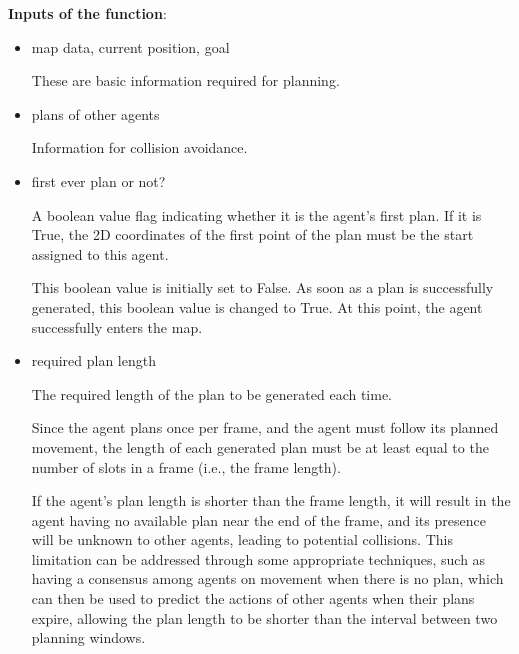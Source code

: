 \textbf{Inputs of the function}:
\begin{itemize}
    \item map data, current position, goal
    
    These are basic information required for planning. 

    \item plans of other agents
    
    Information for collision avoidance.

    \item first ever plan or not?
    
    A boolean value flag indicating whether it is the agent's first plan. If it is True, the 2D coordinates of the first point of the plan must be the start assigned to this agent.
    
    This boolean value is initially set to False. As soon as a plan is successfully generated, this boolean value is changed to True. At this point, the agent successfully enters the map.



    \item required plan length
    
    The required length of the plan to be generated each time.

    Since the agent plans once per frame, and the agent must follow its planned movement, the length of each generated plan must be at least equal to the number of slots in a frame (i.e., the frame length).

    If the agent's plan length is shorter than the frame length, it will result in the agent having no available plan near the end of the frame, and its presence will be unknown to other agents, leading to potential collisions.
    This limitation can be addressed through some appropriate techniques, such as having a consensus among agents on movement when there is no plan, which can then be used to predict the actions of other agents when their plans expire, allowing the plan length to be shorter than the interval between two planning windows.
    

\end{itemize}
